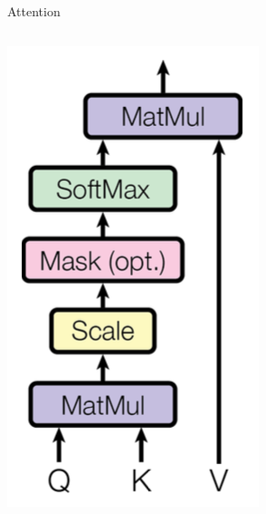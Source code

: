 \documentclass{beamer}
\begin{document}
\begin{frame}{Attention}
\begin{columns}
        \includegraphics[width=3\linewidth]{f8.png} %
    \end{columns}
\end{frame}
\end{document}
